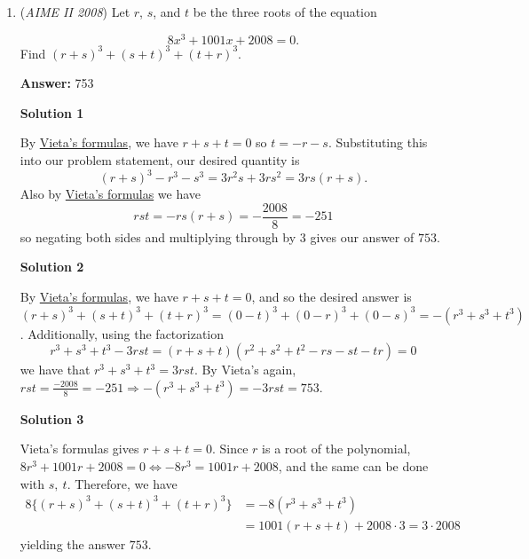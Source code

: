 \begin{enumerate}
 From this, we can determine that the sequence $\frac {b_n}{a_n}$ corresponds to the \href{https://artofproblemsolving.com/wiki/index.php?title=Triangular\_number}{triangular numbers}.

 


	\item (\textit{AIME II 2008}) Let $r$, $s$, and $t$ be the three roots of the equation

 \[8x^3 + 1001x + 2008 = 0.\]
Find $(r + s)^3 + (s + t)^3 + (t + r)^3$.


 
 \textbf{Answer: }753



\textbf{Solution 1}

By \href{https://artofproblemsolving.com/wiki/index.php?title=Vieta\%27s\_formulas}{Vieta's formulas}, we have $r + s + t = 0$ so $t = -r - s.$ Substituting this into our problem statement, our desired quantity is 
 \[(r + s)^3 - r^3 - s^3 = 3r^2s + 3rs^2 = 3rs(r + s).\] Also by \href{https://artofproblemsolving.com/wiki/index.php?title=Vieta\%27s\_formulas}{Vieta's formulas} we have 
 \[rst = -rs(r + s) = -\dfrac{2008}{8} = -251\] so negating both sides and multiplying through by 3 gives our answer of $\boxed{753}.$




\textbf{Solution 2}

By \href{https://artofproblemsolving.com/wiki/index.php?title=Vieta\%27s\_formulas}{Vieta's formulas}, we have $r+s+t = 0$, and so the desired answer is $(r+s)^3 + (s+t)^3 + (t+r)^3 = (0-t)^3 + (0-r)^3 + (0-s)^3 = -(r^3 + s^3 + t^3)$. Additionally, using the factorization
 \[r^3 + s^3 + t^3 - 3rst = (r+s+t)(r^2 + s^2 + t^2 - rs - st - tr) = 0\]we have that $r^3 + s^3 + t^3 = 3rst$. By Vieta's again, $rst = \frac{-2008}8 = -251 \Longrightarrow -(r^3 + s^3 + t^3) = -3rst = \boxed{753}.$




\textbf{Solution 3}

Vieta's formulas gives $r + s + t = 0$. Since $r$ is a root of the polynomial, $8r^3 + 1001r + 2008 = 0\Longleftrightarrow - 8r^3 = 1001r + 2008$, and the same can be done with $s,\ t$. Therefore, we have
 \begin{align*}8\{(r + s)^3 + (s + t)^3 + (t + r)^3\} &= - 8(r^3 + s^3 + t^3)\\ &= 1001(r + s + t) + 2008\cdot 3 = 3\cdot 2008\end{align*}
yielding the answer $\boxed{753}$.


\end{enumerate}
